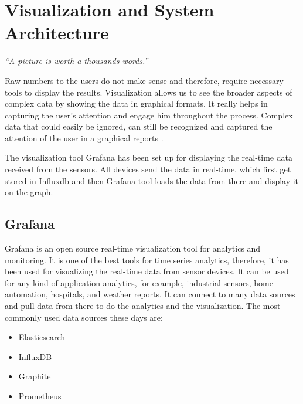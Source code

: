 \chapter{Visualization and System Architecture}


\makeatletter
\renewcommand{\@chapapp}{}%
\newenvironment{chapquote}[2][2em]
{\setlength{\@tempdima}{#1}%
	\def\chapquote@author{#2}%
	\parshape 1 \@tempdima \dimexpr{}\@tempdima\relax%
	\itshape}

\makeatother

\begin{center}
	\begin{chapquote}{}
		``A picture is worth a thousands words.''
	\end{chapquote}
\end{center}

Raw numbers to the users do not make sense and therefore, require necessary tools to display the results. Visualization allows us to see the broader aspects of complex data by showing the data in graphical formats. It really helps in capturing the user's attention and engage him throughout the process. Complex data that could easily be ignored, can still be recognized and captured the attention of the user in a graphical reports \cite{quora:Sulakshana}.

The visualization tool Grafana has been set up for displaying the real-time data received from the sensors. All devices send the data in real-time, which first get stored in Influxdb and then Grafana tool loads the data from there and display it on the graph. 

\section{Grafana}
Grafana is an open source real-time visualization tool for analytics and monitoring. It is one of the best tools for time series analytics, therefore, it has been used for visualizing the real-time data from sensor devices. It can be used for any kind of application analytics, for example, industrial sensors, home automation, hospitals, and weather reports. It can connect to many data sources and pull data from there to do the analytics and the visualization. The most commonly used data sources these days are:

\begin{itemize}
	\item Elasticsearch
	\item InfluxDB
	\item Graphite
	\item Prometheus  
\end{itemize}

